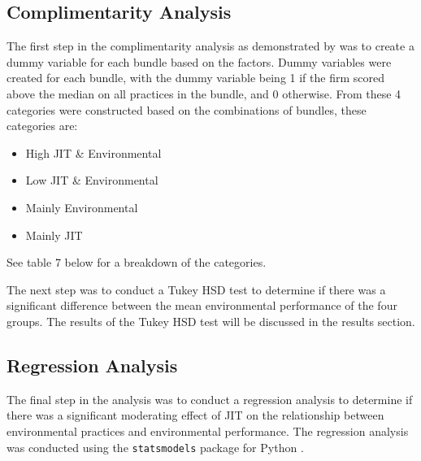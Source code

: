 \subsection*{Complimentarity Analysis}
The first step in the complimentarity analysis as demonstrated by \citep{furlanComplementarityLeanManufacturing2011} was to create a dummy variable for each bundle based on the factors.
Dummy variables were created for each bundle, with the dummy variable being 1 if the firm scored above the median on all practices in the bundle, and 0 otherwise.
From these 4 categories were constructed based on the combinations of bundles, these categories are:
\begin{itemize}
    \item High JIT \& Environmental
    \item Low JIT \& Environmental
    \item Mainly Environmental
    \item Mainly JIT
\end{itemize}
See table 7 below for a breakdown of the categories.

The next step was to conduct a Tukey HSD test to determine if there was a significant difference between the mean environmental performance of the four groups.
The results of the Tukey HSD test will be discussed in the results section.
\subsection*{Regression Analysis}
The final step in the analysis was to conduct a regression analysis to determine if there was a significant moderating effect of JIT on the relationship between environmental practices and environmental performance.
The regression analysis was conducted using the \texttt{statsmodels} package for Python \citep{seaboldStatsmodelsEconometricStatistical2010}.

